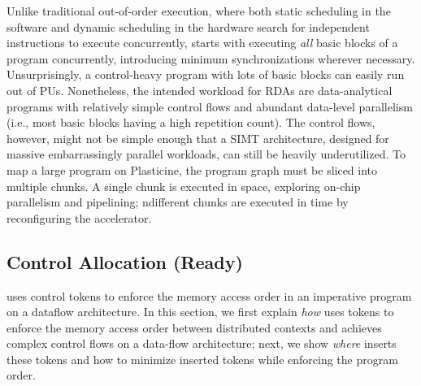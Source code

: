 Unlike traditional out-of-order execution, where both static scheduling in the software and dynamic
scheduling in the hardware search for independent instructions to execute concurrently, 
\name starts with executing \emph{all} basic blocks of a program concurrently,
introducing minimum synchronizations wherever necessary.
Unsurprisingly, a control-heavy program with lots of basic blocks can easily run out of PUs.
Nonetheless, the intended workload for RDAs are data-analytical programs with relatively simple
control flows and abundant data-level parallelism (i.e., most basic blocks having a high repetition
count).
The control flows, however, might not be simple enough that a SIMT architecture, designed for
massive embarrassingly parallel workloads, can still be heavily underutilized.
To map a large program on Plasticine, the program graph must be sliced into multiple chunks.
A single chunk is executed in space, exploring on-chip parallelism and pipelining;
ndifferent chunks are executed in time by reconfiguring the accelerator.

\subsection{Control Allocation (Ready)} \label{sec:controlalloc}
\label{sec:sync}
\name uses control tokens to enforce the memory access order in an imperative program on a dataflow
architecture. 
In this section, we first explain \emph{how} \name uses tokens to enforce the memory access 
order between distributed contexts and achieves complex control flows on a data-flow architecture;
next, we show \emph{where} \name inserts these tokens and how to minimize inserted tokens while
enforcing the program order.


